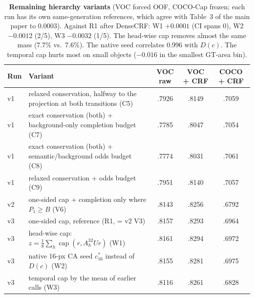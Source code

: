 \begin{table}[t]
\centering
\footnotesize\setlength{\tabcolsep}{4pt}
\begin{tabular}{@{}llccc@{}}
\toprule
Run & Variant & VOC raw & VOC + CRF & COCO + CRF \\
\midrule
v1 & relaxed conservation, halfway to the projection at both transitions (C5) & .7926 & .8149 & .7059 \\
v1 & exact conservation (both) + background-only completion budget (C7) & .7785 & .8047 & .7054 \\
v1 & exact conservation (both) + semantic/background odds budget (C8) & .7774 & .8031 & .7061 \\
v1 & relaxed conservation + odds budget (C9) & .7951 & .8140 & .7057 \\
v2 & one-sided cap + completion only where $P_1\ge B$ (V6) & .8143 & .8256 & .6792 \\
\midrule
v3 & one-sided cap, reference (R1, = v2 V3) & .8157 & .8293 & .6964 \\
v3 & head-wise cap: $z=\frac18\sum_h\operatorname{cap}(r,A^{32}_hUr)$ (W1) & .8161 & .8294 & .6972 \\
v3 & native 16-px CA seed $c^\ast_{16}$ instead of $D(c)$ (W2) & .8155 & .8281 & .6975 \\
v3 & temporal cap by the mean of earlier calls (W3) & .8116 & .8261 & .6828 \\
\bottomrule
\end{tabular}
\caption{\textbf{Remaining hierarchy variants} (VOC forced OOF, COCO-Cap frozen; each run has its own same-generation references, which agree with Table~3 of the main paper to 0.0003). Against R1 after DenseCRF: W1 $+0.0001$ (CI spans 0), W2 $-0.0012$ (2/5), W3 $-0.0032$ (1/5). The head-wise cap removes almost the same mass (7.7\% vs.\ 7.6\%). The native seed correlates 0.996 with $D(c)$. The temporal cap hurts most on small objects ($-0.016$ in the smallest GT-area bin).}
\label{tab:supp_hier}
\end{table}
